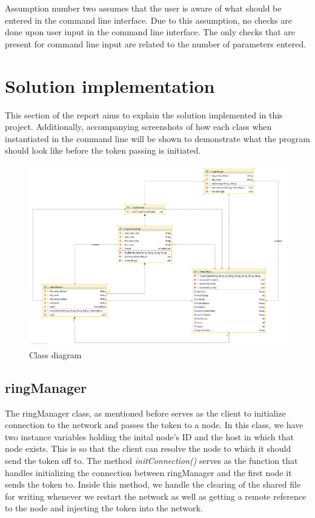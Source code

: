 \documentclass[11pt, a4paper]{article}
\begin{document}
Assumption number two assumes that the user is aware of what should be entered in the command line interface. Due to this assumption, no checks are done upon user input in the command line interface. The only checks that are present for command line input are related to the number of parameters entered. 

\newpage

\section{Solution implementation}

This section of the report aims to explain the solution implemented in this project. Additionally, accompanying screenshots of how each class when instantiated in the command line will be shown to demonstrate what the program should look like before the token passing is initiated.

\begin{figure}[!h]
\centering
\includegraphics[scale=0.26]{class_diagram}
\caption{Class diagram}
\end{figure}

\subsection{ringManager}

The ringManager class, as mentioned before serves as the client to initialize connection to the network and passes the token to a node. In this class, we have two instance variables holding the inital node's ID and the host in which that node exists. This is so that the client can resolve the node to which it should send the token off to. The method \textit{initConnection()} serves as the function that handles initializing the connection between ringManager and the first node it sends the token to. Inside this method, we handle the clearing of the shared file for writing whenever we restart the network as well as getting a remote reference to the node and injecting the token into the network.
\end{document}
